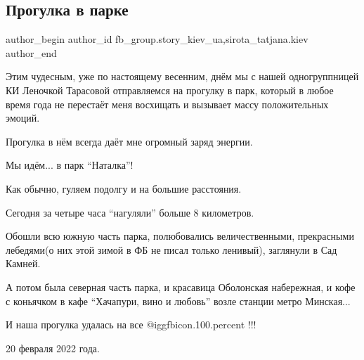  
 
 
 
 
 
\subsection{Прогулка в парке}
\label{sec:21_02_2022.fb.fb_group.story_kiev_ua.2.progulka_v_parke}
 
\ifcmt
 author_begin
   author_id fb_group.story_kiev_ua,sirota_tatjana.kiev
 author_end
\fi

Этим чудесным, уже по настоящему весенним, днём мы с нашей одногруппницей КИ
Леночкой Тарасовой отправляемся на прогулку в парк, который в любое время года
не перестаёт меня восхищать и вызывает массу положительных эмоций.


Прогулка в нём всегда даёт мне огромный заряд энергии.

Мы идём... в парк \enquote{Наталка}!

Как обычно, гуляем подолгу и на большие расстояния.


Сегодня за четыре часа \enquote{нагуляли} больше 8 километров.


Обошли всю южную часть парка, полюбовались величественными, прекрасными
лебедями(о них этой зимой в ФБ не писал только ленивый), заглянули в Сад
Камней.

А потом была северная часть парка, и красавица Оболонская набережная, и кофе с
коньячком в кафе \enquote{Хачапури, вино и любовь} возле  станции метро
Минская...

И наша прогулка удалась на все  @igg{fbicon.100.percent} !!!

20 февраля 2022 года.
